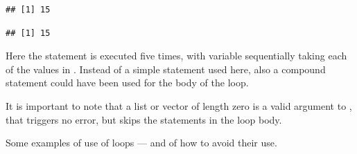 \documentclass[krantz2]{krantz}\usepackage{knitr}%
\begin{document}
\begin{knitrout}\footnotesize
{}\color{fgcolor}\begin{kframe}
\begin{alltt}
 \hlkwb{<-} 
   \hlopt{:} \hlkwb{<-}  \hlopt{+} 
\end{alltt}
\begin{verbatim}
## [1] 15
\end{verbatim}
\begin{alltt}
 \hlkwb{<-} \hlstd{(}\hlopt{:}\hlstd{)} 
\end{alltt}
\begin{verbatim}
## [1] 15
\end{verbatim}
\end{kframe}
\end{knitrout}

Here the statement  is executed five times, with variable  sequentially taking each of the values in . Instead of a simple statement used here, also a compound statement could have been used for the body of the  loop.

\begin{warningbox}
It is important to note that a list or vector of length zero is a valid argument to , that triggers no error, but skips the statements in the loop body.
\end{warningbox}

Some examples of use of  loops --- and of how to avoid their use.
\end{document}
